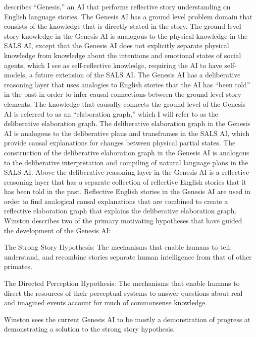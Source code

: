 \cite{winston:2011} describes ``Genesis,'' an AI that performs
reflective story understanding on English language stories.  The
Genesis AI has a ground level problem domain that consists of the
knowledge that is directly stated in the story.  The ground level
story knowledge in the Genesis AI is analogous to the physical
knowledge in the SALS AI, except that the Genesis AI does not
explicitly separate physical knowledge from knowledge about the
intentions and emotional states of social agents, which I see as
self-reflective knowledge, requiring the AI to have self-models, a
future extension of the SALS AI.  The Genesis AI has a deliberative
reasoning layer that uses analogies to English stories that the AI has
``been told'' in the past in order to infer causal connections between
the ground level story elements.  The knowledge that causally connects
the ground level of the Genesis AI is referred to as an ``elaboration
graph,'' which I will refer to as the deliberative elaboration graph.
The deliberative elaboration graph in the Genesis AI is analogous to
the deliberative plans and transframes in the SALS AI, which provide
causal explanations for changes between physical partial states.  The
construction of the deliberative elaboration graph in the Genesis AI
is analogous to the deliberative interpretation and compiling of
natural language plans in the SALS AI.  Above the deliberative
reasoning layer in the Genesis AI is a reflective reasoning layer that
has a separate collection of reflective English stories that it has
been told in the past.  Reflective English stories in the Genesis AI
are used in order to find analogical causal explanations that are
combined to create a reflective elaboration graph that explains the
deliberative elaboration graph.  Winston describes two of the primary
motivating hypotheses that have guided the development of the Genesis
AI:
\begin{packed_enumerate}
\item{The Strong Story Hypothesis: The mechanisms that enable humans
  to tell, understand, and recombine stories separate human
  intelligence from that of other primates.}
\item{The Directed Perception Hypothesis: The mechanisms that enable
  humans to direct the resources of their perceptual systems to answer
  questions about real and imagined events account for much of
  commonsense knowledge.}
\end{packed_enumerate}
Winston sees the current Genesis AI to be mostly a demonstration of
progress at demonstrating a solution to the strong story hypothesis.
